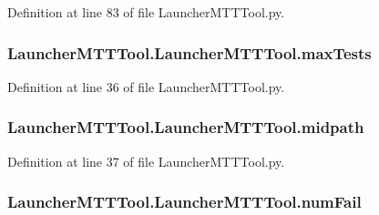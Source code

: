Definition at line 83 of file Launcher\-M\-T\-T\-Tool.\-py.

\hypertarget{class_launcher_m_t_t_tool_1_1_launcher_m_t_t_tool_aa8e59ca462ace6b189cd849a08afa639}{
\subsubsection[{max\-Tests}]{\setlength{\rightskip}{0pt plus 5cm}Launcher\-M\-T\-T\-Tool.\-Launcher\-M\-T\-T\-Tool.\-max\-Tests}}\label{class_launcher_m_t_t_tool_1_1_launcher_m_t_t_tool_aa8e59ca462ace6b189cd849a08afa639}


Definition at line 36 of file Launcher\-M\-T\-T\-Tool.\-py.

\hypertarget{class_launcher_m_t_t_tool_1_1_launcher_m_t_t_tool_a37f255feb0dac2f1eb0e6eff2746bd7b}{
\subsubsection[{midpath}]{\setlength{\rightskip}{0pt plus 5cm}Launcher\-M\-T\-T\-Tool.\-Launcher\-M\-T\-T\-Tool.\-midpath}}\label{class_launcher_m_t_t_tool_1_1_launcher_m_t_t_tool_a37f255feb0dac2f1eb0e6eff2746bd7b}


Definition at line 37 of file Launcher\-M\-T\-T\-Tool.\-py.

\hypertarget{class_launcher_m_t_t_tool_1_1_launcher_m_t_t_tool_a17fe6e6f8981cc1f7cd1953cac37668a}{
\subsubsection[{num\-Fail}]{\setlength{\rightskip}{0pt plus 5cm}Launcher\-M\-T\-T\-Tool.\-Launcher\-M\-T\-T\-Tool.\-num\-Fail}}\label{class_launcher_m_t_t_tool_1_1_launcher_m_t_t_tool_a17fe6e6f8981cc1f7cd1953cac37668a}


